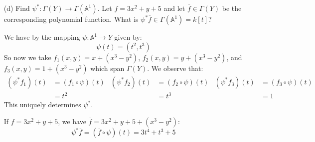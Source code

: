 \documentclass{article}
\begin{document}
\begin{itemize}
        \item [(d)] Find $\psi^{*} : \Gamma(Y) \rightarrow \Gamma(\mathbb{A}^{1})$. Let $f = 3x^{2} + y + 5$ and let $\overline{f} \in \Gamma(Y)$ be the corresponding polynomial function. What is $\psi^{*}\overline{f} \in \Gamma(\mathbb{A}^{1}) = k[t]$?
            \begin{answer}
                We have by the mapping $\psi : \mathbb{A}^{1} \rightarrow Y$ given by:
                \begin{equation*}
                    \psi(t) = (t^{2}, t^{3})
                \end{equation*}
            So now we take $f_{1}(x, y) = x + (x^{3} - y^{2})$, $f_{2}(x, y) = y + (x^{3} - y^{2})$, and $f_{3}(x, y) = 1 + (x^{3} - y^{2})$ which span $\Gamma(Y)$. We observe that:
                \begin{align*}
                    (\psi^{*}f_{1})(t) &= (f_{1} \circ \psi)(t) & (\psi^{*}f_{2})(t) &= (f_{2} \circ \psi)(t) & (\psi^{*}f_{3})(t) &= (f_{3} \circ \psi)(t) \\
                                  &= t^{2}                     &               &= t^{3}                       &               &= 1                         
                \end{align*}
            This uniquely determines $\psi^{*}$.

            If $f = 3x^{2} + y + 5$, we have $\overline{f} = 3x^{2} + y + 5 + (x^{3} - y^{2})$:
                \begin{equation*}
                    \psi^{*}\overline{f} = (\overline{f} \circ \psi)(t) = 3t^{4} + t^{3} + 5 
                \end{equation*}
            \end{answer}
    \end{itemize}
\end{document}
